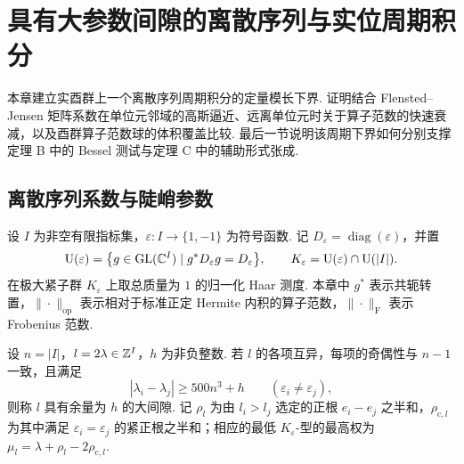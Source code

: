 \chapter{具有大参数间隙的离散序列与实位周期积分}
\label{chap:discrete-series}
\label{chap:appendix-ds}

\begin{chapterguide}
本章建立实酉群上一个离散序列周期积分的定量模长下界. 证明结合 Flensted--Jensen 矩阵系数在单位元邻域的高斯逼近、远离单位元时关于算子范数的快速衰减，以及酉群算子范数球的体积覆盖比较. 最后一节说明该周期下界如何分别支撑定理 B 中的 Bessel 测试与定理 C 中的辅助形式张成.
\end{chapterguide}

\section{离散序列系数与陡峭参数}
\label{sec:ch8-steep-params}

设 $I$ 为非空有限指标集，$\varepsilon\colon I\to\{1,-1\}$ 为符号函数. 记 $D_\varepsilon=\operatorname{diag}(\varepsilon)$，并置
\[
\operatorname{U}(\varepsilon)=\bigl\{g\in\operatorname{GL}(\mathbb{C}^I)\mid g^*D_\varepsilon g=D_\varepsilon\bigr\},
\qquad
K_\varepsilon=\operatorname{U}(\varepsilon)\cap \operatorname{U}(|I|).
\]
在极大紧子群 $K_\varepsilon$ 上取总质量为 $1$ 的归一化 Haar 测度. 本章中 $g^*$ 表示共轭转置，$\|\cdot\|_{\mathrm{op}}$ 表示相对于标准正定 Hermite 内积的算子范数，$\|\cdot\|_{\mathrm F}$ 表示 Frobenius 范数.

\begin{definition}[加倍参数与大间隙]
\label{def:ch8-large-gap}
\emitthmsource
设 $n=|I|$，$l=2\lambda\in\mathbb{Z}^I$，$h$ 为非负整数. 若 $l$ 的各项互异，每项的奇偶性与 $n-1$ 一致，且满足
\[
 |\lambda_i-\lambda_j|\ge 500n^3+h
 \qquad(\varepsilon_i\ne\varepsilon_j),
\]
则称 $l$ 具有余量为 $h$ 的大间隙. 记 $\rho_l$ 为由 $l_i>l_j$ 选定的正根 $e_i-e_j$ 之半和，$\rho_{\mathrm c,l}$ 为其中满足 $\varepsilon_i=\varepsilon_j$ 的紧正根之半和；相应的最低 $K_\varepsilon$-型的最高权为 $\mu_l=\lambda+\rho_l-2\rho_{\mathrm c,l}$.
\end{definition}

